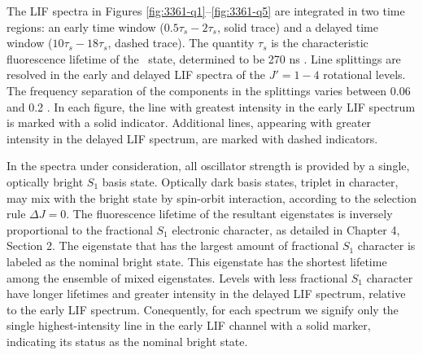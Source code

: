 The LIF spectra in Figures \ref{fig:3361-q1}--\ref{fig:3361-q5} are
integrated in two time regions: an early time window
($0.5\tau_s-2\tau_s$, solid trace) and a delayed time window
($10\tau_s-18\tau_s$, dashed trace).  The quantity $\tau_s$ is the
characteristic fluorescence lifetime of the \astate\ state,
determined to be 270 ns \cite{ochi91}.  Line splittings are resolved
in the early and delayed LIF spectra of the $J'=1-4$ rotational
levels.  The frequency separation of the components in the splittings
varies between 0.06 and 0.2 \rcm.  In each figure, the line with
greatest intensity in the early LIF spectrum is marked with a solid
indicator.  Additional lines, appearing with greater intensity in the
delayed LIF spectrum, are marked with dashed indicators.

In the spectra under consideration, all oscillator strength is
provided by a single, optically bright $S_1$ basis state.  Optically
dark basis states, triplet in character, may mix with the bright state
by spin-orbit interaction, according to the selection rule $\Delta J =
0$.  The fluorescence lifetime of the resultant eigenstates is
inversely proportional to the fractional $S_1$ electronic character,
as detailed in Chapter 4, Section 2.  The eigenstate that has the
largest amount of fractional $S_1$ character is labeled as the nominal
bright state.  This eigenstate has the shortest lifetime among the
ensemble of mixed eigenstates.  Levels with less fractional $S_1$
character have longer lifetimes and greater intensity in the delayed
LIF spectrum, relative to the early LIF spectrum.  Conequently, for
each spectrum we signify only the single highest-intensity line in the
early LIF channel with a solid marker, indicating its status as the
nominal bright state.


